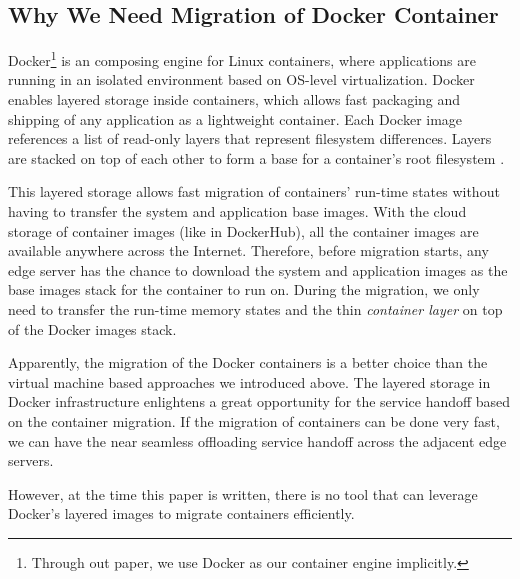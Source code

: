 \subsection{Why We Need Migration of Docker Container}
Docker\footnote{Through out paper, we use Docker as our container engine implicitly.} is an composing engine for Linux containers, where applications are running in an isolated environment based on OS-level virtualization. Docker enables layered storage inside containers, which allows fast packaging and shipping of any application as a lightweight container. Each Docker image references a list of read-only layers that represent filesystem differences. Layers are stacked on top of each other to form a base for a container's root filesystem \cite{dockerlayer}. 

This layered storage allows fast migration of containers' run-time states without having to transfer the system and application base images. With the cloud storage of container images (like in DockerHub), all the container images are available anywhere across the Internet. Therefore, before migration starts, any edge server has the chance to download the system and application images as the base images stack for the container to run on. 
During the migration, we only need to transfer the run-time memory states and the thin \textit{container layer} on top of the Docker images stack. 

Apparently, the migration of the Docker containers is a better choice than the virtual machine based approaches we introduced above. The layered storage in Docker infrastructure enlightens a great opportunity for the service handoff based on the container migration. If the migration of containers can be done very fast, we can have the near seamless offloading service handoff across the adjacent edge servers.

However, at the time this paper is written, there is no tool that can leverage Docker's layered images to migrate containers efficiently. 
